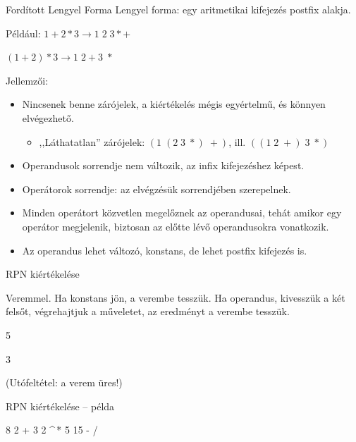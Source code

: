 \documentclass[hungarian]{beamer}
\begin{document}
\begin{frame}{Fordított Lengyel Forma}
Lengyel forma: egy aritmetikai kifejezés postfix alakja.

Például:
$1+2 * 3 \rightarrow 1\;2\; 3 * +$

$(1+2) * 3 \rightarrow 1\; 2 + 3\;*$

Jellemzői:
\begin{itemize}
    \item Nincsenek benne zárójelek, a kiértékelés mégis egyértelmű,
és könnyen elvégezhető.
    \begin{itemize}
        \item ,,Láthatatlan'' zárójelek: $(1\;(2\;3\;*)\;+)$, ill. $((1\; 2\; +)\;3\;*)$
    \end{itemize}
    \item Operandusok sorrendje nem változik, az infix kifejezéshez
képest.
    \item Operátorok sorrendje: az elvégzésük sorrendjében
szerepelnek.
    \item Minden operátort közvetlen megelőznek az operandusai,
tehát amikor egy operátor megjelenik, biztosan az előtte
lévő operandusokra vonatkozik.
    \item Az operandus lehet változó, konstans, de lehet postfix
kifejezés is.
\end{itemize}
\end{frame}

\begin{frame}{RPN kiértékelése}

Veremmel. Ha konstans jön, a verembe tesszük. Ha operandus, kivesszük a két felsőt, végrehajtjuk a műveletet, az eredményt a verembe tesszük.

\newcommand{\oneton}{1\,\textrm{to}\,n}
\begin{stukibox}
\begin{WHILE}{5}{}
\begin{IF}{3}{}
\ELSE
{}
\end{IF}
\end{WHILE}
\end{stukibox}
(Utófeltétel: a verem üres!)
\end{frame}

\begin{frame}[t]{RPN kiértékelése -- példa}

8 2 + 3 2 \textasciicircum \,* 5 15 - /

\end{frame}
\end{document}
